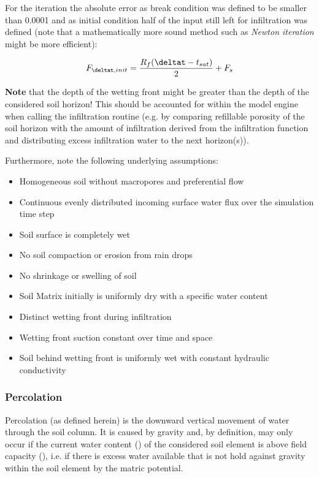 For the iteration the absolute error as break condition was defined to be smaller than \num{0.0001} and as initial condition half of the input still left for infiltration was defined (note that a mathematically more sound method such as \emph{Newton iteration} might be more efficient):

\begin{equation}
F_{\deltat,init} = \frac{R_f (\deltat - t_{sat})}{2} + F_{s}
\end{equation}

\textbf{Note} that the depth of the wetting front might be greater than the depth of the considered soil horizon! This should be accounted for within the model engine when calling the infiltration routine (e.g. by comparing refillable porosity of the soil horizon with the amount of infiltration derived from the infiltration function and distributing excess infiltration water to the next horizon(s)).

Furthermore, note the following underlying assumptions:

\begin{itemize}
\item Homogeneous soil without macropores and preferential flow
\item Continuous evenly distributed incoming surface water flux over the simulation time step
\item Soil surface is completely wet
\item No soil compaction or erosion from rain drops
\item No shrinkage or swelling of soil
\item Soil Matrix initially is uniformly dry with a specific water content
\item Distinct wetting front during infiltration
\item Wetting front suction constant over time and space
\item Soil behind wetting front is uniformly wet with constant hydraulic conductivity
\end{itemize}






\subsubsection{Percolation} \label{sec:rungen:perc}
Percolation (as defined herein) is the downward vertical movement of water through the soil column. It is caused by gravity and, by definition, may only occur if the current water content (\waterCont{}) of the considered soil element is above field capacity (\waterContFK{}), i.e. if there is excess water available that is not hold against gravity within the soil element by the matric potential.

